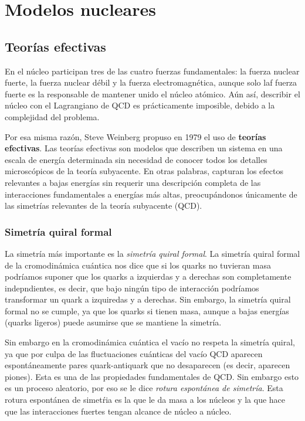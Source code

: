 \chapter{Modelos nucleares}

\section{Teorías efectivas}


En el núcleo participan tres de las cuatro fuerzas fundamentales: la fuerza nuclear fuerte, la fuerza nuclear débil y la fuerza electromagnética, aunque solo laf fuerza fuerte es la responsable de mantener unido el núcleo atómico. Aún así, describir el núcleo con el Lagrangiano de QCD es prácticamente imposible, debido a la complejidad del problema. 

Por esa misma razón, Steve Weinberg propuso en 1979 el uso de \textbf{teorías efectivas}. Las teorías efectivas son modelos que describen un sistema en una escala de energía determinada sin necesidad de conocer todos los detalles microscópicos de la teoría subyacente. En otras palabras, capturan los efectos relevantes a bajas energías sin requerir una descripción completa de las interacciones fundamentales a energías más altas, preocupándonos únicamente de las simetrías relevantes de la teoría subyacente (QCD). 

\subsection{Simetría quiral formal}

La simetría más importante es la \textit{simetría quiral formal}. La simetría quiral formal de la cromodinámica cuántica nos dice que si los quarks no tuvieran masa podríamos suponer que los quarks a izquierdas y a derechas son completamente indepndientes, es decir, que bajo ningún tipo de interacción podríamos transformar un quark a izquiredas y a derechas. Sin embargo, la simetría quiral formal no se cumple, ya que los quarks si tienen masa, aunque a bajas energías (quarks ligeros) puede asumirse que se mantiene la simetría. 

Sin embargo en la cromodinámica cuántica el vacío no respeta la simetría quiral, ya que por culpa de las fluctuaciones cuánticas del vacío QCD aparecen espontáneamente pares quark-antiquark que no desaparecen (es decir, aparecen piones). Esta es una de las propiedades fundamentales de QCD. Sin embargo esto es un proceso aleatorio, por eso se le dice \textit{rotura espontánea de simetría}. Esta rotura espontánea de simetŕia es la que le da masa a los núcleos y la que hace que las interacciones fuertes tengan alcance de núcleo a núcleo. 

